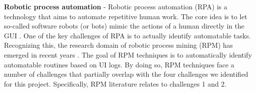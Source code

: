  \noindent{}

\textbf{Robotic process automation} - Robotic process automation (RPA) is a technology that aims to automate repetitive human work. The core idea is to let so-called software robots (or bots) mimic the actions of a human directly in the GUI \cite{SYED2020103162}. One of the key challenges of RPA is to actually identify automatable tasks.  Recognizing this, the research domain of robotic process mining (RPM) has emerged in recent years \cite{leno2021robotic}. The goal of RPM techniques is to automatically identify automatable routines based on UI logs. By doing so, RPM techniques face a number of challenges that partially overlap with the four challenges we identified for this project. Specifically, RPM literature relates to challenges 1 and 2.   

